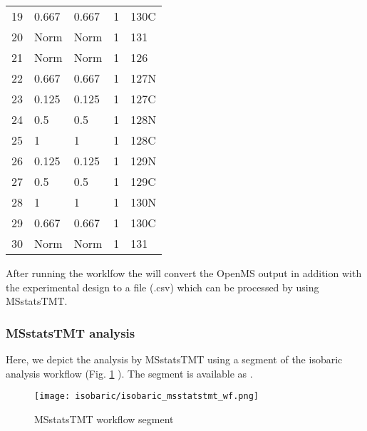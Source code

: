 \begin{table}[ht]
\begin{tabular*}{0.90\textwidth}{lllll}
19     & 0.667              & 0.667                 & 1                & 130C      \\
20     & Norm               & Norm                  & 1                & 131       \\
21     & Norm               & Norm                  & 1                & 126       \\
22     & 0.667              & 0.667                 & 1                & 127N      \\
23     & 0.125              & 0.125                 & 1                & 127C      \\
24     & 0.5                & 0.5                   & 1                & 128N      \\
25     & 1                  & 1                     & 1                & 128C      \\
26     & 0.125              & 0.125                 & 1                & 129N      \\
27     & 0.5                & 0.5                   & 1                & 129C      \\
28     & 1                  & 1                     & 1                & 130N      \\
29     & 0.667              & 0.667                 & 1                & 130C      \\
30     & Norm               & Norm                  & 1                & 131   
\end{tabular*}
\end{table}

\noindent After running the worklfow the  will convert the OpenMS output in addition with the experimental design to a file (.csv) which can be processed by using MSstatsTMT.

\subsubsection{MSstatsTMT analysis}
Here, we depict the analysis by MSstatsTMT using a segment of the isobaric analysis workflow (Fig. \ref{fig:isobaric_msstatstmtwf} ). The segment is available as . \\

\begin{figure}[htbp]
\caption{MSstatsTMT workflow segment}
\centering
\texttt{[image: isobaric/isobaric\_msstatstmt\_wf.png]}
 \label{fig:isobaric_msstatstmtwf}
\end{figure}

